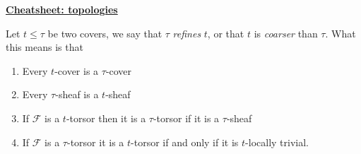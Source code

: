 \begin{mdframed}[style=cheatsheet]
\begin{center}

\underline{\textbf{Cheatsheet: topologies}}


Let $t \le \tau$ be two covers, we say that $\tau$ \textit{refines} $t$, or that $t$ is \textit{coarser} than $\tau$. What this means is that
\begin{enumerate}
    \item Every $t$-cover is a $\tau$-cover
    \item Every $\tau$-sheaf is a $t$-sheaf
    \item If $\mathscr{F}$ is a $t$-torsor then it is a $\tau$-torsor if it is a $\tau$-sheaf
    \item If $\mathscr{F}$ is a $\tau$-torsor it is a $t$-torsor if and only if it is $t$-locally trivial.
\end{enumerate}


\end{center}
\end{mdframed}
